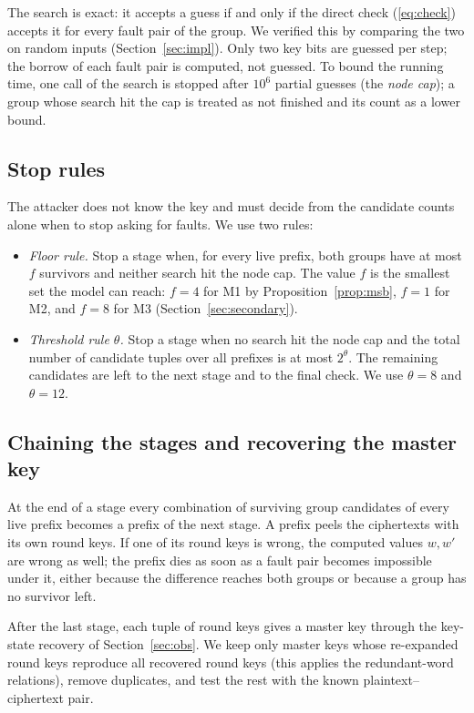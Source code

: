 \documentclass[pdflatex,sn-mathphys-num]{sn-jnl}
\theoremstyle{thmstyleone}%
\theoremstyle{thmstylethree}%
\begin{document}
The search is exact: it accepts a guess if and only if the direct check (\ref{eq:check}) accepts it for
every fault pair of the group. We verified this by comparing the two on random inputs
(Section~\ref{sec:impl}). Only two key bits are guessed per step; the borrow of each fault pair is
computed, not guessed. To bound the running time, one call of the search is stopped after $10^{6}$
partial guesses (the \emph{node cap}); a group whose search hit the cap is treated as not finished and its
count as a lower bound.

\subsection{Stop rules}

The attacker does not know the key and must decide from the candidate counts alone when to stop
asking for faults. We use two rules:
\begin{itemize}
\item \emph{Floor rule.} Stop a stage when, for every live prefix, both groups have at most $f$
survivors and neither search hit the node cap. The value $f$ is the smallest set the model can reach:
$f=4$ for M1 by Proposition~\ref{prop:msb}, $f=1$ for M2, and $f=8$ for M3
(Section~\ref{sec:secondary}).
\item \emph{Threshold rule $\theta$.} Stop a stage when no search hit the node cap and the total number
of candidate tuples over all prefixes is at most $2^{\theta}$. The remaining candidates are left to the
next stage and to the final check. We use $\theta = 8$ and $\theta = 12$.
\end{itemize}

\subsection{Chaining the stages and recovering the master key}

At the end of a stage every combination of surviving group candidates of every live prefix becomes a
prefix of the next stage. A prefix peels the ciphertexts with its own round keys. If one of its round
keys is wrong, the computed values $w,w'$ are wrong as well; the prefix dies as soon as a fault pair
becomes impossible under it, either because the difference reaches both groups or because a group has
no survivor left.

After the last stage, each tuple of round keys gives a master key through the key-state recovery of
Section~\ref{sec:obs}. We keep only master keys whose re-expanded round keys reproduce all recovered
round keys (this applies the redundant-word relations), remove duplicates, and test the rest with the
known plaintext--ciphertext pair.
\end{document}
